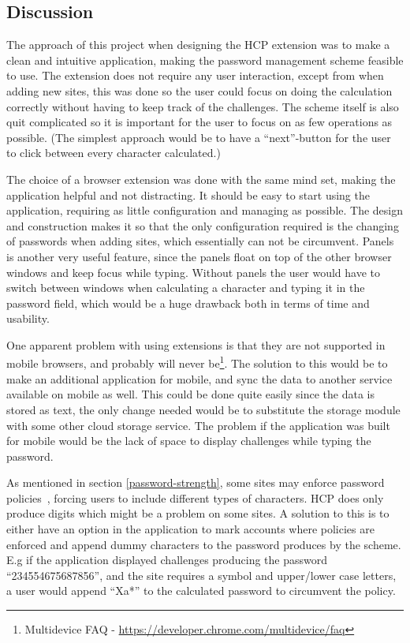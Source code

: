 \subsection{Discussion}
The approach of this project when designing the HCP extension was to make a clean and intuitive application, making the password management scheme feasible to use. The extension does not require any user interaction, except from when adding new sites, this was done so the user could focus on doing the calculation correctly without having to keep track of the challenges. The scheme itself is also quit complicated so it is important for the user to focus on as few operations as possible. (The simplest approach would be to have a ``next''-button for the user to click between every character calculated.)
\par The choice of a browser extension was done with the same mind set, making the application helpful and not distracting. It should be easy to start using the application, requiring as little configuration and managing as possible. The design and construction makes it so that the only configuration required is the changing of passwords when adding sites, which essentially can not be circumvent. Panels is another very useful feature, since the panels float on top of the other browser windows and keep focus while typing. Without panels the user would have to switch between windows when calculating a character and typing it in the password field, which would be a huge drawback both in terms of time and usability. 
\par One apparent problem with using extensions is that they are not supported in mobile browsers, and probably will never be\footnote{Multidevice FAQ - \url{https://developer.chrome.com/multidevice/faq}}. The solution to this would be to make an additional application for mobile, and sync the data to another service available on mobile as well. This could be done quite easily since the data is stored as text, the only change needed would be to substitute the storage module with some other cloud storage service. The problem if the application was built for mobile would be the lack of space to display challenges while typing the password. 
\par As mentioned in section \ref{password-strength}, some sites may enforce password policies~\cite{password-policy}, forcing users to include different types of characters. HCP does only produce digits which might be a problem on some sites. A solution to this is to either have an option in the application to mark accounts where policies are enforced and append dummy characters to the password produces by the scheme. E.g if the application displayed challenges producing the password ``234554675687856'', and the site requires a symbol and upper/lower case letters, a user would append ``Xa*'' to the calculated password to circumvent the policy. 
